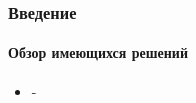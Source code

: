 \documentclass[10pt]{beamer}
\begin{document}

\begin{frame}
\frametitle{Введение}
\framesubtitle{Обзор имеющихся решений}

\begin{itemize}
	\item -
\end{itemize}

\end{frame}


\end{document}
